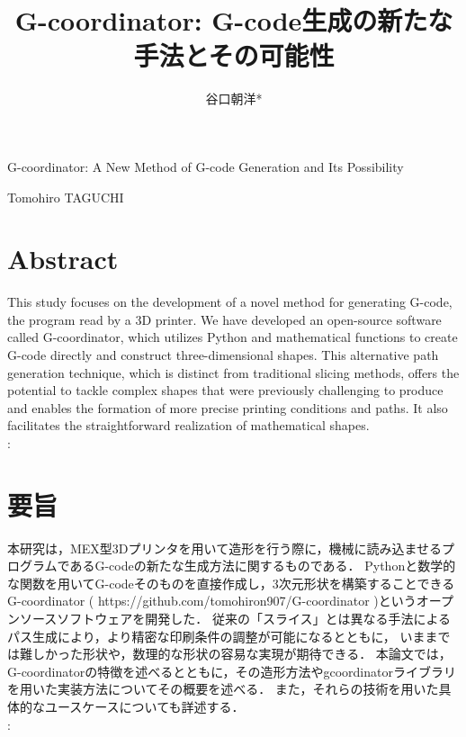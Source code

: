 \documentclass{article}
\begin{document}
\title{G-coordinator: G-code生成の新たな手法とその可能性}
\author{谷口朝洋*}
\maketitle

\begin{center}
  \large
  G-coordinator: A New Method of G-code Generation and Its Possibility
  
  Tomohiro TAGUCHI
\end{center}




\section*{Abstract}
This study focuses on the development of a novel method for generating G-code, the program read by a 3D printer. 
We have developed an open-source software called G-coordinator, 
which utilizes Python and mathematical functions to create G-code directly and construct three-dimensional shapes. 
This alternative path generation technique, which is distinct from traditional slicing methods, 
offers the potential to tackle complex shapes that were previously challenging to produce 
and enables the formation of more precise printing conditions and paths. 
It also facilitates the straightforward realization of mathematical shapes.\\
: 

\section*{要旨}
本研究は，MEX型3Dプリンタを用いて造形を行う際に，機械に読み込ませるプログラムであるG-codeの新たな生成方法に関するものである．
Pythonと数学的な関数を用いてG-codeそのものを直接作成し，3次元形状を構築することできるG-coordinator 
( https://github.com/tomohiron907/G-coordinator )というオープンソースソフトウェアを開発した．
従来の「スライス」とは異なる手法によるパス生成により，より精密な印刷条件の調整が可能になるとともに，
いままでは難しかった形状や，数理的な形状の容易な実現が期待できる．
本論文では，G-coordinatorの特徴を述べるとともに，その造形方法やgcoordinatorライブラリを用いた実装方法についてその概要を述べる．
また，それらの技術を用いた具体的なユースケースについても詳述する．\\
: 
\end{document}
